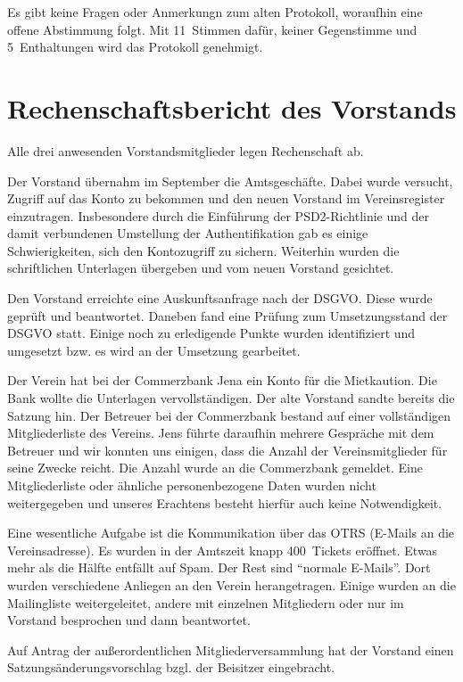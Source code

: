 \documentclass[DIV=calc,parksip=half*]{scrartcl}
\begin{document}
Es gibt keine Fragen oder Anmerkungn zum alten Protokoll, woraufhin eine offene Abstimmung folgt. Mit 11~Stimmen dafür, keiner Gegenstimme und 5~Enthaltungen wird das Protokoll genehmigt.

\section{Rechenschaftsbericht des Vorstands}

Alle drei anwesenden Vorstandsmitglieder legen Rechenschaft ab. 

Der Vorstand übernahm im September die Amtsgeschäfte. Dabei wurde versucht, Zugriff auf das Konto zu bekommen und den neuen Vorstand im Vereinsregister einzutragen. Insbesondere durch die Einführung der PSD2-Richtlinie und der damit verbundenen Umstellung der Authentifikation gab es einige Schwierigkeiten, sich den Kontozugriff zu sichern.
Weiterhin wurden die schriftlichen Unterlagen übergeben und vom neuen Vorstand gesichtet.

Den Vorstand erreichte eine Auskunftsanfrage nach der DSGVO. Diese wurde geprüft und beantwortet. Daneben fand eine Prüfung zum Umsetzungsstand der DSGVO statt. Einige noch zu erledigende Punkte wurden identifiziert und umgesetzt bzw. es wird an der Umsetzung gearbeitet.

Der Verein hat bei der Commerzbank Jena ein Konto für die Mietkaution. Die Bank wollte die Unterlagen vervollständigen. Der alte Vorstand sandte bereits die Satzung hin. Der Betreuer bei der Commerzbank bestand auf einer vollständigen Mitgliederliste des Vereins. Jens führte daraufhin mehrere Gespräche mit dem Betreuer und wir konnten uns einigen, dass die Anzahl der Vereinsmitglieder für seine Zwecke reicht. Die Anzahl wurde an die Commerzbank gemeldet. Eine Mitgliederliste oder ähnliche personenbezogene Daten wurden nicht weitergegeben und unseres Erachtens besteht hierfür auch keine Notwendigkeit.

Eine wesentliche Aufgabe ist die Kommunikation über das OTRS (E-Mails an die Vereinsadresse). Es wurden in der Amtszeit knapp 400~Tickets eröffnet. Etwas mehr als die Hälfte entfällt auf Spam. Der Rest sind \enquote{normale E-Mails}. Dort wurden verschiedene Anliegen an den Verein herangetragen. Einige wurden an die Mailingliste weitergeleitet, andere mit einzelnen Mitgliedern oder nur im Vorstand besprochen und dann beantwortet.

Auf Antrag der außerordentlichen Mitgliederversammlung hat der Vorstand einen Satzungsänderungsvorschlag bzgl. der Beisitzer eingebracht. 
\end{document}
